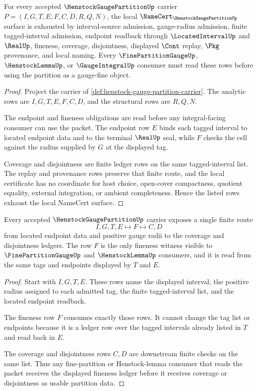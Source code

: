 \begin{theorem}
\label{thm:henstock-gauge-partition-namecert-obligations}
For every accepted $\HenstockGaugePartitionUp$ carrier $P=(I,G,T,E,F,C,D,R,Q,N)$, the local $\NameCert_{\HenstockGaugePartitionUp}$ surface is exhausted by interval-source admission, gauge-radius admission, finite tagged-interval admission, endpoint readback through $\LocatedIntervalUp$ and $\RealUp$, fineness, coverage, disjointness, displayed $\Cont$ replay, $\Pkg$ provenance, and local naming. Every $\FinePartitionGaugeUp$, $\HenstockLemmaUp$, or $\GaugeIntegralUp$ consumer must read these rows before using the partition as a gauge-fine object.
\end{theorem}
\begin{proof}
Project the carrier of \autoref{def:henstock-gauge-partition-carrier}. The analytic rows are $I,G,T,E,F,C,D$, and the structural rows are $R,Q,N$.

The endpoint and fineness obligations are read before any integral-facing consumer can use the packet. The endpoint row $E$ binds each tagged interval to located endpoint data and to the terminal $\RealUp$ seal, while $F$ checks the cell against the radius supplied by $G$ at the displayed tag.

Coverage and disjointness are finite ledger rows on the same tagged-interval list. The replay and provenance rows preserve that finite route, and the local certificate has no coordinate for host choice, open-cover compactness, quotient equality, external integration, or ambient completeness. Hence the listed rows exhaust the local NameCert surface.
\end{proof}

\begin{theorem}
\label{thm:henstock-gauge-partition-fineness-ledger}
Every accepted $\HenstockGaugePartitionUp$ carrier exposes a single finite route
$$
I,G,T,E \longmapsto F \longmapsto C,D
$$
from located endpoint data and positive gauge radii to the coverage and disjointness ledgers. The row $F$ is the only fineness witness visible to $\FinePartitionGaugeUp$ and $\HenstockLemmaUp$ consumers, and it is read from the same tags and endpoints displayed by $T$ and $E$.
\end{theorem}
\begin{proof}
Start with $I,G,T,E$. These rows name the displayed interval, the positive radius assigned to each admitted tag, the finite tagged-interval list, and the located endpoint readback.

The fineness row $F$ consumes exactly those rows. It cannot change the tag list or endpoints because it is a ledger row over the tagged intervals already listed in $T$ and read back in $E$.

The coverage and disjointness rows $C,D$ are downstream finite checks on the same list. Thus any fine-partition or Henstock-lemma consumer that reads the packet receives the displayed fineness ledger before it receives coverage or disjointness as usable partition data.
\end{proof}


